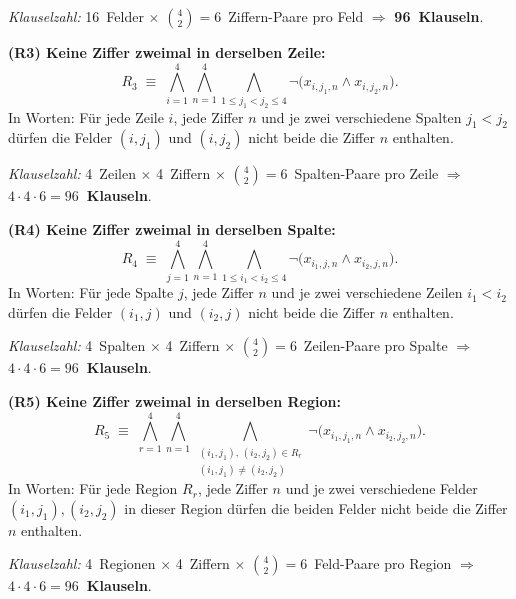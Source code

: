 \documentclass[a4paper,12pt]{article}
\begin{document}
\textit{Klauselzahl:} 16~Felder $\times$ $\binom{4}{2} = 6$~Ziffern-Paare
pro Feld $\Rightarrow$ \textbf{96~Klauseln}.

\smallskip
\textbf{(R3) Keine Ziffer zweimal in derselben Zeile:}
\[
R_3 \;\equiv\; \bigwedge_{i=1}^{4} \bigwedge_{n=1}^{4}
\bigwedge_{1 \le j_1 < j_2 \le 4}
\neg\bigl(x_{i,j_1,n} \wedge x_{i,j_2,n}\bigr).
\]
In Worten: F\"ur jede Zeile $i$, jede Ziffer $n$ und je zwei
verschiedene Spalten $j_1 < j_2$ d\"urfen die Felder $(i, j_1)$ und
$(i, j_2)$ nicht beide die Ziffer $n$ enthalten.

\textit{Klauselzahl:} 4~Zeilen $\times$ 4~Ziffern $\times$
$\binom{4}{2} = 6$~Spalten-Paare pro Zeile
$\Rightarrow$ \textbf{$4 \cdot 4 \cdot 6 = 96$~Klauseln}.

\smallskip
\textbf{(R4) Keine Ziffer zweimal in derselben Spalte:}
\[
R_4 \;\equiv\; \bigwedge_{j=1}^{4} \bigwedge_{n=1}^{4}
\bigwedge_{1 \le i_1 < i_2 \le 4}
\neg\bigl(x_{i_1,j,n} \wedge x_{i_2,j,n}\bigr).
\]
In Worten: F\"ur jede Spalte $j$, jede Ziffer $n$ und je zwei
verschiedene Zeilen $i_1 < i_2$ d\"urfen die Felder $(i_1, j)$ und
$(i_2, j)$ nicht beide die Ziffer $n$ enthalten.

\textit{Klauselzahl:} 4~Spalten $\times$ 4~Ziffern $\times$
$\binom{4}{2} = 6$~Zeilen-Paare pro Spalte
$\Rightarrow$ \textbf{$4 \cdot 4 \cdot 6 = 96$~Klauseln}.

\smallskip
\textbf{(R5) Keine Ziffer zweimal in derselben Region:}
\[
R_5 \;\equiv\; \bigwedge_{r=1}^{4} \bigwedge_{n=1}^{4}
\bigwedge_{\substack{(i_1,j_1),\,(i_2,j_2) \in R_r \\ (i_1,j_1) \neq (i_2,j_2)}}
\neg\bigl(x_{i_1,j_1,n} \wedge x_{i_2,j_2,n}\bigr).
\]
In Worten: F\"ur jede Region $R_r$, jede Ziffer $n$ und je zwei
verschiedene Felder $(i_1, j_1), (i_2, j_2)$ in dieser Region
d\"urfen die beiden Felder nicht beide die Ziffer $n$ enthalten.

\textit{Klauselzahl:} 4~Regionen $\times$ 4~Ziffern $\times$
$\binom{4}{2} = 6$~Feld-Paare pro Region
$\Rightarrow$ \textbf{$4 \cdot 4 \cdot 6 = 96$~Klauseln}.

\bigskip
\noindent{}

\newpage
\end{document}

